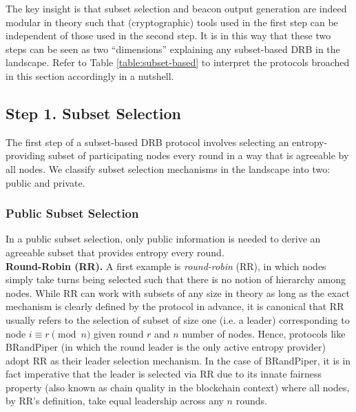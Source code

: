 \documentclass[letterpaper,twocolumn,10pt]{article}
\theoremstyle{definition}
\theoremstyle{remark}
\begin{document}
The key insight is that subset selection and beacon output generation are indeed modular in theory such that (cryptographic) tools used in the first step can be independent of those used in the second step. It is in this way that these two steps can be seen as two ``dimensions'' explaining any subset-based DRB in the landscape. Refer to Table \ref{table:subset-based} to interpret the protocols broached in this section accordingly in a nutshell.

\subsection{Step 1. Subset Selection}
The first step of a subset-based DRB protocol involves selecting an entropy-providing subset of participating nodes every round in a way that is agreeable by all nodes. We classify subset selection mechanisms in the landscape into two: public and private.

\subsubsection{Public Subset Selection}
\label{subsubsection:public-subset-selection}
In a public subset selection, only public information is needed to derive an agreeable subset that provides entropy every round.\\

\noindent\textbf{Round-Robin (RR).} A first example is \textit{round-robin} (RR), in which nodes simply take turns being selected such that there is no notion of hierarchy among nodes. While RR can work with subsets of any size in theory as long as the exact mechanism is clearly defined by the protocol in advance, it is canonical that RR usually refers to the selection of subset of size one (i.e. a leader) corresponding to node $i \equiv r \pmod n$ given round $r$ and $n$ number of nodes. Hence, protocols like BRandPiper \cite{bhat2020randpiper} (in which the round leader is the only active entropy provider) adopt RR as their leader selection mechanism. In the case of BRandPiper, it is in fact imperative that the leader is selected via RR due to its innate fairness property \cite{azouvi2018winning} (also known as chain quality \cite{garay2015bitcoin} in the blockchain context) where all nodes, by RR's definition, take equal leadership across any $n$ rounds.\\
\end{document}
